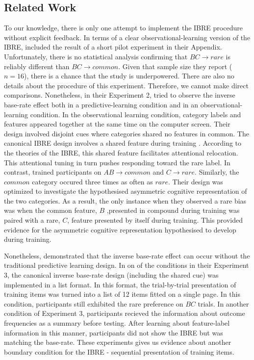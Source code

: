 \documentclass[10pt,letterpaper]{article}
\begin{document}
\subsection{Related Work}

To our knowledge, there is only one attempt to implement the IBRE procedure without explicit feedback.
In terms of a clear observational-learning version of the IBRE,  included the result of a short pilot experiment in their Appendix.
Unfortunately, there is no statistical analysis confirming that $BC \to rare$ is reliably different than $BC \to common$.
Given that sample size they report ($n = 16$), there is a chance that the study is underpowered.
There are also no details about the procedure of this experiment.
Therefore, we cannot make direct comparisons.
Nonetheless, in their Experiment 2,  tried to observe the inverse base-rate effect both in a predictive-learning condition and in an observational-learning condition.
In the observational learning condition, category labels and features appeared together at the same time on the computer screen.
Their design involved disjoint cues where categories shared no features in common.
The canonical IBRE design involves a shared feature during training \cite{kruschke2001inverse, wills2014attention}.
According to the theories of the IBRE, this shared feature facilitates attentional relocation.
This attentional tuning in turn pushes responding toward the rare label.
In contrast,  trained participants on $AB \to common$ and $C \to rare$.
Similarly, the $common$ category occured three times as often as $rare$.
Their design was optimized to investigate the hypothesised asymmetric cognitive representation of the two categories.
As a result, the only instance when they observed a rare bias was when the common feature, $B$ ,presented in compound during training was paired with a rare, $C$, feature presented by itself during training.
This provided evidence for the asymmetric cognitive representation \cite{kruschke2001inverse} hypothesised to develop during training.

Nonetheless,  demonstrated that the inverse base-rate effect can occur without the traditional predictive learning design.
In on of the conditions in their Experiment 3, the canonical inverse base-rate design (including the shared cue) was implemented in a list format.
In this format, the trial-by-trial presentation of training items was turned into a list of 12 items fitted on a single page.
In this condition, participants still exhibited the rare preference on $BC$ trials.
In another condition of Experiment 3, participants recieved the information about outcome frequencies as a summary before testing.
After learning about feature-label information in this manner, participants did not show the IBRE but was matching the base-rate.
These experiments gives us evidence about another boundary condition for the IBRE - sequential presentation of training items.
\end{document}
